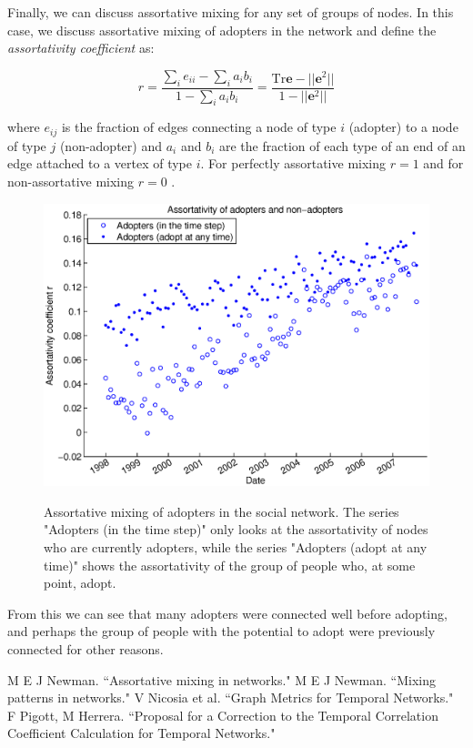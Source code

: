 \documentclass[12pt]{article}
\begin{document}
Finally, we can discuss assortative mixing for any set of groups of nodes. In this case, we discuss assortative mixing of adopters in the network and define the \emph{assortativity coefficient} as:

\begin{equation}
r = \frac{\sum_i e_{ii} - \sum_i a_i b_i}{1 - \sum_i a_i b_i} = \frac{\text{Tr} \mathbf{e} - || \mathbf{e}^2||}{1 - || \mathbf{e}^2||}
\end{equation}

where \(e_{ij}\) is the fraction of edges connecting a node of type \(i\) (adopter) to a node of type \(j\) (non-adopter) and \(a_i\) and \(b_i\) are the fraction of each type of an end of an edge attached to a vertex of type \(i\). For perfectly assortative mixing \(r = 1\) and for non-assortative mixing \(r = 0\) \cite{1}.

\begin{figure}[H]
\includegraphics[trim = 0cm 0cm 0cm 0cm, width = .9\textwidth]{Graficos/adoptAssort.eps}
\label{fig:adoptAssort}
\caption{Assortative mixing of adopters in the social network. The series "Adopters (in the time step)" only looks at the assortativity of nodes who are currently adopters, while the series "Adopters (adopt at any time)" shows the assortativity of the group of people who, at some point, adopt. }
\end{figure}

From this we can see that many adopters were connected well before adopting, and perhaps the group of people with the potential to adopt were previously connected for other reasons.


%
%

\begin{thebibliography}{99}
 M E J Newman. ``Assortative mixing in networks." 
 M E J Newman. ``Mixing patterns in networks."
 V Nicosia et al. ``Graph Metrics for Temporal Networks." 
 F Pigott, M Herrera. ``Proposal for a Correction to the Temporal Correlation Coefficient Calculation for Temporal Networks."
\end{thebibliography}
\end{document}
